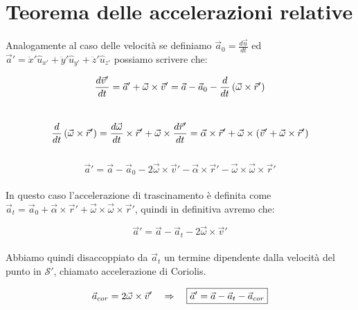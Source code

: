 \section{Teorema delle accelerazioni relative}
Analogamente al caso delle velocità se definiamo $\vec a_0 = \frac{d\vec u}{dt}$
ed $\vec a' = \ddot x'\hat u_{x'}+\ddot y'\hat u_{y'}+\ddot z'\hat u_{z'}$
possiamo scrivere che:

\begin{equation}
    \frac{d\vec v'}{dt} = \vec a' + \vec\omega\times\vec v' = \vec a - \vec a_0
    -\frac d{dt}\left(\vec\omega\times\vec r'\right)
\end{equation}
\\
\begin{equation}
    \frac d{dt}\left(\vec\omega\times\vec r'\right) = \frac{d\vec\omega}{dt}\times\vec r'
    + \vec\omega\times\frac{d\vec r'}{dt} = \vec\alpha\times\vec r' + \vec\omega\times
    \left(\vec v' + \vec\omega\times\vec r'\right)
\end{equation}
\\
\begin{equation}
    \boxed{\vec a' = \vec a - \vec a_0 - 2\vec\omega\times\vec v'-\vec\alpha\times
    \vec r' - \vec\omega\times\vec\omega\times\vec r'}
\end{equation}
\\
In questo caso l'accelerazione di trascinamento è definita come $\vec a_t = 
\vec a_0 + \vec\alpha\times\vec r' +\vec\omega\times\vec\omega\times\vec r'$,
quindi in definitiva avremo che:

\begin{equation}
    \vec a' = \vec a - \vec a_t -2\vec\omega\times\vec v'
\end{equation}
\\
Abbiamo quindi disaccoppiato da $\vec a_t$ un termine dipendente dalla velocità
del punto in $\mathcal{S'}$, chiamato accelerazione di Coriolis.

\begin{equation}
    \vec a_{cor} = 2\vec\omega\times\vec v'\quad\Rightarrow\quad \boxed{\vec a' = \vec a -\vec a_t
    -\vec a_{cor}}
\end{equation}
